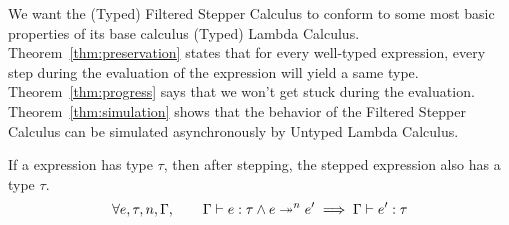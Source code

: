 








We want the (Typed) Filtered Stepper Calculus to conform to some most
basic properties of its base calculus (Typed) Lambda Calculus.
Theorem~\ref{thm:preservation} states that for every well-typed
expression, every step during the evaluation of the expression will
yield a same type. Theorem~\ref{thm:progress} says that we won't get
stuck during the evaluation. Theorem~\ref{thm:simulation} shows that
the behavior of the Filtered Stepper Calculus can be simulated
asynchronously by Untyped Lambda Calculus.

\begin{theorem}[Preservation]\label{thm:preservation}
  If a expression has type \(\tau\), then after stepping, the stepped expression also has a type \(\tau\).
  \[
    \forall e, \tau, n, \Gamma, \qquad
    \TypeEntails{\Gamma}{e}{\tau} \land \Step{e}{e'}{n} \implies \TypeEntails{\Gamma}{e'}{\tau}
  \]
\end{theorem}

